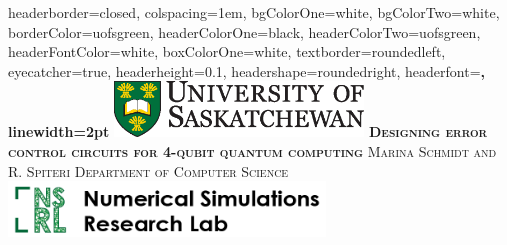 \documentclass[landscape,a0paper,fontscale=0.285]{baposter} %
\begin{document}
\begin{poster}
{
headerborder=closed, %
colspacing=1em, %
bgColorOne=white, %
bgColorTwo=white, %
borderColor=uofsgreen, %
headerColorOne=black, %
headerColorTwo=uofsgreen, %
headerFontColor=white, %
boxColorOne=white, %
textborder=roundedleft, %
eyecatcher=true, %
headerheight=0.1\textheight, %
headershape=roundedright, %
headerfont=\Large\bf\textsc, %
linewidth=2pt %
}
%
{\includegraphics[height=4em]{UofS}} %
{\bf\textsc{Designing error control circuits for 4-qubit quantum computing}\vspace{0.5em}} %
{\textsc{Marina Schmidt and R. Spiteri\hspace{12pt}  Department of Computer Science}} %
{\includegraphics[height=4em]{NRSL-Mesh2-01.png}} %




\end{poster}
\end{document}
